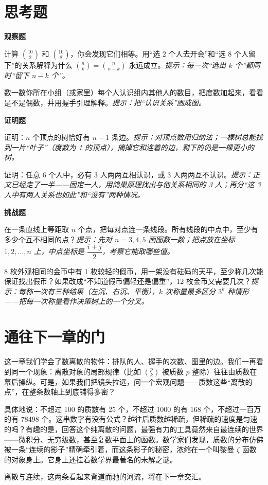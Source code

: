 \section*{思考题}

\textbf{观察题}
\begin{sikao}
\item 计算 $\binom{10}{2}$ 和 $\binom{10}{8}$，你会发现它们相等。用“选 2 个人去开会”和“选 8 个人留下”的关系解释为什么 $\binom{n}{k}=\binom{n}{n-k}$ 永远成立。\emph{提示：每一次“选出 $k$ 个”都同时“留下 $n-k$ 个”。}
\item 数一数你所在小组（或家里）每个人认识组内其他人的数目，把度数加起来，看看是不是偶数，并用握手引理解释。\emph{提示：把“认识关系”画成图。}
\end{sikao}

\textbf{证明题}
\begin{sikao}
\item 证明：$n$ 个顶点的树恰好有 $n-1$ 条边。\emph{提示：对顶点数用归纳法；一棵树总能找到一片“叶子”（度数为 1 的顶点），摘掉它和连着的边，剩下的仍是一棵更小的树。}
\item 证明：任意 6 个人中，必有 3 人两两互相认识，或 3 人两两互不认识。\emph{提示：正文已经走了一半——固定一人，用鸽巢原理找出与他关系相同的 3 人；再分“这 3 人中有两人关系也如此”和“没有”两种情况。}
\end{sikao}

\textbf{挑战题}
\begin{sikao}
\item 在一条直线上等距取 $n$ 个点，把每对点连一条线段。所有线段的中点中，至少有多少个互不相同的点？\emph{提示：先对 $n=3,4,5$ 画图数一数；把点放在坐标 $1,2,\dots,n$ 上，中点坐标是 $\dfrac{i+j}{2}$，考察它能取哪些值。}
\item 8 枚外观相同的金币中有 1 枚较轻的假币，用一架没有砝码的天平，至少称几次能保证找出假币？如果改成“不知道假币偏轻还是偏重”，12 枚金币又需要几次？\emph{提示：每称一次有三种结果（左沉、右沉、平衡），$k$ 次称量最多区分 $3^k$ 种情形——把每一次称量看作决策树上的一个分叉。}
\end{sikao}

\section*{通往下一章的门}

这一章我们学会了数离散的物件：排队的人、握手的次数、图里的边。我们一再看到同一个现象：离散对象的局部规律（比如 $\binom{p}{k}$ 被质数 $p$ 整除）往往由质数在幕后操纵。可是，如果我们把镜头拉远，问一个宏观问题——质数这些“离散的点”，在整条数轴上到底铺得多密？

具体地说：不超过 100 的质数有 25 个，不超过 1000 的有 168 个，不超过一百万的有 78498 个。这串数字有没有公式？越往后质数越稀疏，但稀疏的速度是匀速的吗？有趣的是，回答这个纯离散的问题，最强有力的工具竟然来自最连续的世界——微积分、无穷级数，甚至复数平面上的函数。数学家们发现，质数的分布仿佛被一条“连续的影子”精确牵引着，而这条影子的秘密，浓缩在一个叫黎曼 $\zeta$ 函数的对象身上。它身上还挂着数学界最著名的未解之谜。

离散与连续，这两条看起来背道而驰的河流，将在下一章交汇。
